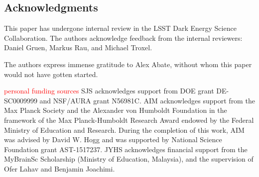 \documentclass[\docopts]{\docclass}
\newcommand{\red}[1]{\textcolor{red}{#1}}
\begin{document}









\subsection*{Acknowledgments}


This paper has undergone internal review in the LSST Dark Energy Science Collaboration.
The authors acknowledge feedback from the internal reviewers: Daniel Gruen, Markus Rau, and Michael Troxel. %




The authors express immense gratitude to Alex Abate, without whom this paper would not have gotten started.

{ \red{personal funding sources}}
SJS acknowledges support from DOE grant DE-SC0009999 and NSF/AURA grant N56981C.
AIM acknowledges support from the Max Planck Society and the Alexander von Humboldt Foundation in the framework of the Max Planck-Humboldt Research Award endowed by the Federal Ministry of Education and Research.
During the completion of this work, AIM was advised by David W. Hogg and was supported by National Science Foundation grant AST-1517237.
JYHS acknowledges financial support from the MyBrainSc Scholarship (Ministry of Education, Malaysia), and the supervision of Ofer Lahav and Benjamin Joachimi.
\end{document}

